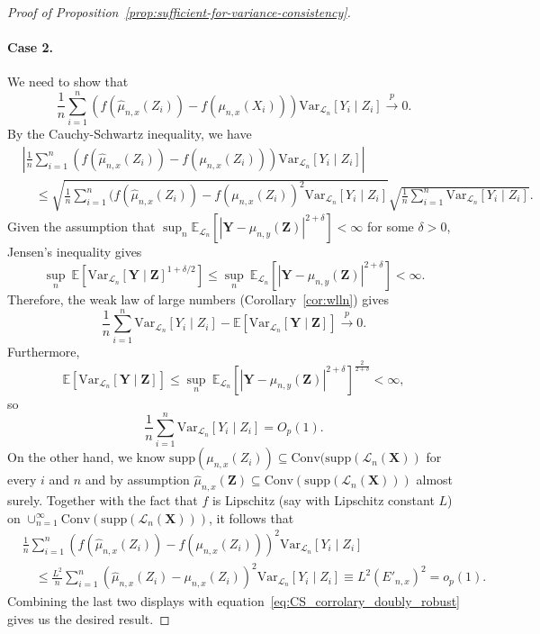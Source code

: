 \documentclass[12pt]{article}
\theoremstyle{definition}
\theoremstyle{remark}
\newcommand{\E}{\mathbb E}								%
\newcommand{\V}{\mathrm{Var}}							%
\newcommand{\convp}{\overset p \rightarrow}             %
\newcommand{\prx}{\bm X}								%
\newcommand{\srx}{X}									%
\newcommand{\prz}{\bm Z}								%
\newcommand{\srz}{Z}									%
\newcommand{\pry}{{\bm Y}}								%
\newcommand{\sry}{Y}									%
\newcommand{\law}{\mathcal L}							%
\begin{document}
\begin{proof}[Proof of Proposition~\ref{prop:sufficient-for-variance-consistency}]
\paragraph{Case 2.}
We need to show that
$$
\frac{1}{n} \sum_{i=1}^n (f(\widehat \mu_{n,x}(Z_i))-f(\mu_{n,x}(\srx_i)))\V_{\law_n}[\sry_i\mid \srz_i] \convp 0.
$$
By the Cauchy-Schwartz inequality, we have
\begin{equation}
\begin{split} \label{eq:CS_corrolary_doubly_robust}
	&\left|\frac{1}{n} \sum_{i=1}^n (f(\widehat \mu_{n,x}(\srz_i))-f(\mu_{n,x}(\srz_i)))\V_{\law_n}[\sry_i\mid \srz_i]\right| \\ &\quad\leq \sqrt{\frac{1}{n} \sum_{i=1}^n (f(\widehat \mu_{n,x}(Z_i))-f( \mu_{n,x}(Z_i))^2\V_{\law_n}[\sry_i\mid \srz_i]}\sqrt{\frac{1}{n} \sum_{i=1}^n \V_{\law_n}[\sry_i\mid \srz_i]}.
\end{split}
\end{equation}
Given the assumption that $\sup_n \E_{\law_n}[|\pry-\mu_{n,y}(\prz)|^{2+\delta}] < \infty$ for some $\delta>0$, Jensen's inequality gives
\begin{equation*}
	\sup_n\ \E[\V_{\law_n}[\pry\mid \prz]^{1+\delta/2}] \leq \sup_n\ \E_{\law_n}[|\pry-\mu_{n,y}(\prz)|^{2+\delta}] < \infty.
\end{equation*}
Therefore, the weak law of large numbers (Corollary~\ref{cor:wlln}) gives
\begin{equation*}
\frac{1}{n} \sum_{i=1}^n \V_{\law_n}[\sry_i\mid \srz_i]- \E[\V_{\law_n}[\pry\mid \prz]]\convp 0.
\end{equation*}
Furthermore, 
\begin{equation*}
\E[\V_{\law_n}[\pry\mid \prz]] \leq \sup_n\ \E_{\law_n}[|\pry-\mu_{n,y}(\prz)|^{2+\delta}]^{\frac2{2+\delta}} < \infty,
\end{equation*}
so 
\begin{equation*}
	\frac{1}{n} \sum_{i=1}^n \V_{\law_n}[\sry_i\mid \srz_i] = O_p(1).
\end{equation*}
On the other hand, we know $\mathrm{supp}(\mu_{n,x}(Z_i))\subseteq \mathrm{Conv}(\mathrm{supp}(\law_n(\prx))$ for every $i$ and $n$ and by assumption $\widehat{\mu}_{n,x}(\prz)\subseteq\mathrm{Conv}(\mathrm{supp}(\law_n(\prx)))$ almost surely. Together with the fact that $f$ is Lipschitz (say with Lipschitz constant $L$) on $\cup_{n=1}^{\infty}\mathrm{Conv}(\mathrm{supp}(\law_n(\prx)))$, it follows that
\begin{align*}
&\frac{1}{n} \sum_{i=1}^n (f(\widehat \mu_{n,x}(Z_i))-f( \mu_{n,x}(Z_i)))^2\V_{\law_n}[\sry_i\mid \srz_i] \\
&\quad\leq 
\frac{L^2}{n} \sum_{i=1}^n (\widehat \mu_{n,x}(Z_i)- \mu_{n,x}(Z_i))^2\V_{\law_n}[\sry_i\mid \srz_i] \equiv L^2(E'_{n,x})^2 = o_p(1).
\end{align*}
Combining the last two displays with equation~\eqref{eq:CS_corrolary_doubly_robust} gives us the desired result.
\end{proof}
\end{document}
